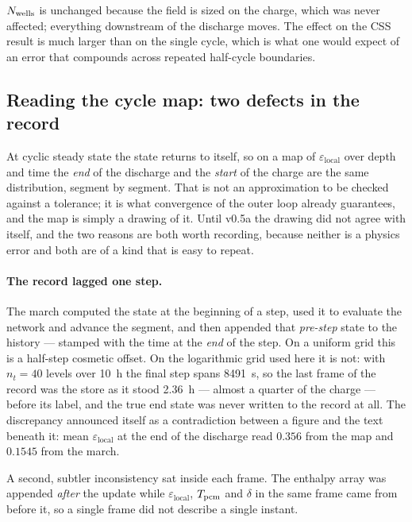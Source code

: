 \noindent
$N_{\mathrm{wells}}$ is unchanged because the field is sized on the charge, which was never
affected; everything downstream of the discharge moves. The effect on the CSS
result is much larger than on the single cycle, which is what one would expect
of an error that compounds across repeated half-cycle boundaries.

\subsection{Reading the cycle map: two defects in the record}
\label{sec:cyclic:record}

At cyclic steady state the state returns to itself, so on a map of
$\varepsilon_{\mathrm{local}}$ over depth and time the \emph{end} of the
discharge and the \emph{start} of the charge are the same distribution, segment
by segment. That is not an approximation to be checked against a tolerance; it
is what convergence of the outer loop already guarantees, and the map is simply
a drawing of it. Until v0.5a the drawing did not agree with itself, and the two
reasons are both worth recording, because neither is a physics error and both
are of a kind that is easy to repeat.

\paragraph{The record lagged one step.}
The march computed the state at the beginning of a step, used it to evaluate the
network and advance the segment, and then appended that \emph{pre-step} state to
the history --- stamped with the time at the \emph{end} of the step. On a
uniform grid this is a half-step cosmetic offset. On the logarithmic grid used
here it is not: with $n_{t}=40$ levels over \SI{10}{\hour} the final step spans
\SI{8491}{\second}, so the last frame of the record was the store as it stood
\SI{2.36}{\hour} --- almost a quarter of the charge --- before its label, and
the true end state was never written to the record at all. The discrepancy
announced itself as a contradiction between a figure and the text beneath it:
mean $\varepsilon_{\mathrm{local}}$ at the end of the discharge read $0.356$
from the map and $0.1545$ from the march.

A second, subtler inconsistency sat inside each frame. The enthalpy array was
appended \emph{after} the update while $\varepsilon_{\mathrm{local}}$,
$T_{\mathrm{pcm}}$ and $\delta$ in the same frame came from before it, so a single frame
did not describe a single instant.

